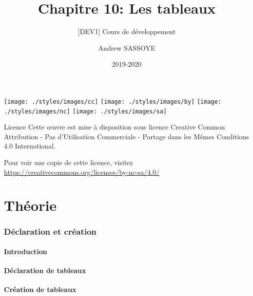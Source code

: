 \documentclass{beamer}
\title{Chapitre 10: Les tableaux}
\subtitle{\tiny [DEV1] Cours de d\'eveloppement}
\author{Andrew SASSOYE}
\date{2019-2020}
\begin{document}
	\begin{frame}
		\titlepage
	\end{frame}

	\begin{frame}
		\begin{center}
			\texttt{[image: ./styles/images/cc]}
			\texttt{[image: ./styles/images/by]}
			\texttt{[image: ./styles/images/nc]}
			\texttt{[image: ./styles/images/sa]}
		\end{center}

		\begin{block}{Licence}
			\small Cette \oe uvre est mise \`a disposition sous licence Creative Common
			Attribution - Pas d\rq Utilisation Commerciale - Partage dans les M\^emes Conditions 4.0 International.
		\end{block}

		\tiny Pour voir une copie de cette licence, visitez
		\href{https://creativecommons.org/licenses/by-nc-sa/4.0/}{https://creativecommons.org/licenses/by-nc-sa/4.0/}
	\end{frame}

    \part{Th\'eorie}
    \frame{\partpage}

    \section{D\'eclaration et cr\'eation}\label{sec:declaration-et-creation}
        \subsection{Introduction}\label{subsec:introduction}
            
        \subsection{D\'eclaration de tableaux}\label{subsec:declaration-de-tableaux}
            
        \subsection{Cr\'eation de tableaux}\label{subsec:creation-de-tableaux}
            
\end{document}
